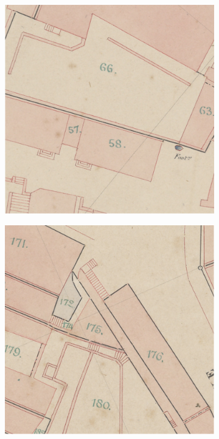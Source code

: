 \documentclass[12pt]{article}
\begin{document}
\begin{figure}[H]
    \centering
    \begin{subfigure}[b]{.235\textwidth}
		\begin{minipage}[t]{1\linewidth}
			\centering
			\includegraphics[width=1\linewidth]{images/patches/img1.png}
		\end{minipage}
	\end{subfigure}
	\begin{subfigure}[b]{.235\textwidth}
		\begin{minipage}[t]{1\linewidth}
			\centering
			\includegraphics[width=1\linewidth]{images/patches/img4.png}

\end{minipage}
\end{subfigure}
\end{figure}
\end{document}
